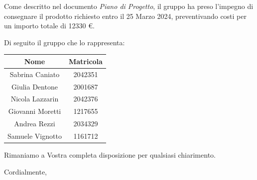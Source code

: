 \documentclass[12pt]{letter}
\begin{document}
\begin{letter}
Come descritto nel documento \textit{Piano di Progetto},
il gruppo ha preso l'impegno di consegnare il prodotto richiesto entro il 25 Marzo 2024, preventivando costi per un importo totale di 12330 €.

Di seguito il gruppo che lo rappresenta:

\begin{tabular}{|c|c|}
\hline
Nome & Matricola \\
\hline
Sabrina Caniato & 2042351 \\
Giulia Dentone & 2001687 \\
Nicola Lazzarin & 2042376 \\
Giovanni Moretti & 1217655 \\
Andrea Rezzi & 2034329 \\
Samuele Vignotto & 1161712 \\
\hline
\end{tabular}

Rimaniamo a Vostra completa disposizione per qualsiasi chiarimento.
\closing{Cordialmente,}

\end{letter}
\end{document}
